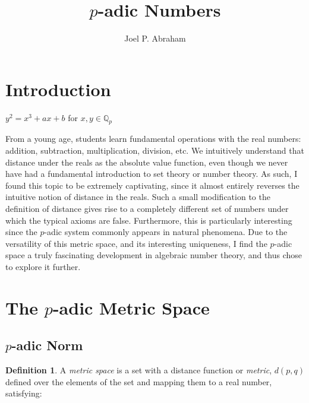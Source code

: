 \documentclass[a4paper]{article}
\title{$p$-adic Numbers}
\author{Joel P. Abraham}
\begin{document}
\maketitle

\section{Introduction}

$y^2=x^3+ax+b$ for $x,y \in \mathbb{Q}_p$

From a young age, students learn fundamental operations with the real numbers: addition, subtraction, multiplication, division, etc. We intuitively understand that distance under the reals as the absolute value function, even though we never have had a fundamental introduction to set theory or number theory. As such, I found this topic to be extremely captivating, since it almost entirely reverses the intuitive notion of distance in the reals. Such a small modification to the definition of distance gives rise to a completely different set of numbers under which the typical axioms are false. Furthermore, this is particularly interesting since the $p$-adic system commonly appears in natural phenomena. Due to the versatility of this metric space, and its interesting uniqueness, I find the $p$-adic space a truly fascinating development in algebraic number theory, and thus chose to explore it further.


\section{The $p$-adic Metric Space}
\subsection{$p$-adic Norm}
\theoremstyle{definition}
\newtheorem{definition}{Definition}[section]
\newtheorem{theorem}{Theorem}[section]
\newtheorem{corollary}{Corollary}[theorem]

\begin{definition}{}
A \textit{metric space} is a set with a distance function or \textit{metric}, $d(p, q)$ defined over the elements of the set and mapping them to a real number, satisfying:
\begin{description}[style=unboxed,leftmargin=2cm]
	\item[(a) $d(p,q)>0$ if $p\neq q$]
	\item[(b) $d(p,p)=0$]
	\item[(c) $d(p,q)=d(q,p)$]
	\item[(d) $d(p,q) \leq d(p,r) + d(r, q)$]
\end{description}
\end{definition}
\end{document}
